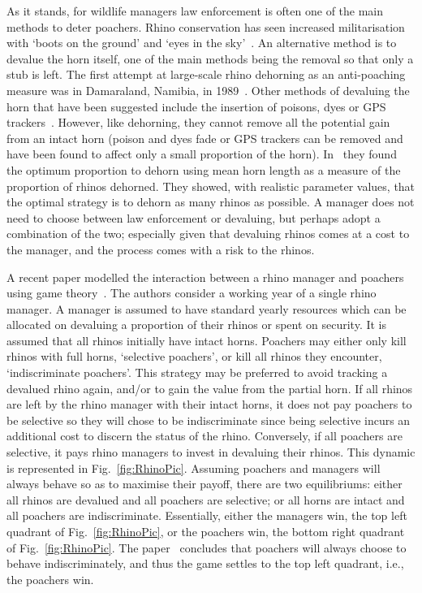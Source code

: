\documentclass[10pt]{article}
\begin{document}
As it stands, for wildlife managers law enforcement is often one of the main methods
to deter poachers. Rhino conservation has seen increased militarisation with `boots
on the ground' and `eyes in the sky'~\cite{duffy_st}. An alternative method is to
devalue the horn itself, one of the main  methods being the removal so that only
a stub is left. The first attempt at large-scale rhino dehorning as an anti-poaching
measure was in Damaraland, Namibia, in 1989~\cite{Milner1992}. Other methods
of devaluing the horn that have been suggested include
the insertion of poisons, dyes or GPS trackers~\cite{Gill2010, Smith1993}. However,
like dehorning, they cannot remove all the potential gain from an intact horn
(poison and dyes fade or GPS trackers can be removed and have been found to affect
only a small proportion of the horn).
In~\cite{Milner1992, milner1999many} they found the
optimum proportion to dehorn using mean horn length as a measure of the
proportion of rhinos dehorned. They showed, with realistic parameter values,
that the optimal strategy is to dehorn as many rhinos as possible.
A manager does not need to choose between law enforcement or devaluing, but
perhaps adopt a combination of the two; especially given that devaluing rhinos
comes at a cost to the manager, and the process comes with a risk to the rhinos.

A recent paper modelled the interaction between a rhino manager and poachers
using game theory~\cite{Lee}. The authors consider a working year of a single
rhino manager. A manager is assumed to have standard yearly resources which
can be allocated on devaluing a proportion of their rhinos or spent on security.
It is assumed that all rhinos initially have intact horns. Poachers may either only
kill rhinos with full horns, `selective poachers', or kill all rhinos they encounter,
`indiscriminate poachers'. This strategy may be preferred to avoid tracking a
devalued rhino again, and/or to gain the value from the partial horn. If all rhinos
are left by the rhino manager with their intact horns, it does not pay poachers to
be selective so they will chose to be indiscriminate since being selective incurs
an additional cost to discern the status of the rhino. Conversely, if all poachers are
selective, it pays rhino managers to invest in devaluing their rhinos.
This dynamic is represented in Fig.~\ref{fig:RhinoPic}.
Assuming poachers and managers will always behave so as to maximise their payoff,
there are two equilibriums: either all rhinos are devalued and all poachers are selective;
or all horns are intact and all poachers are indiscriminate. Essentially, either the managers
win, the top left quadrant of Fig.~\ref{fig:RhinoPic}, or the poachers win, the bottom
right quadrant of Fig.~\ref{fig:RhinoPic}. The paper~\cite{Lee} concludes that poachers will
always choose to behave indiscriminately, and thus the game settles to the top
left quadrant, i.e., the poachers win.
\end{document}
